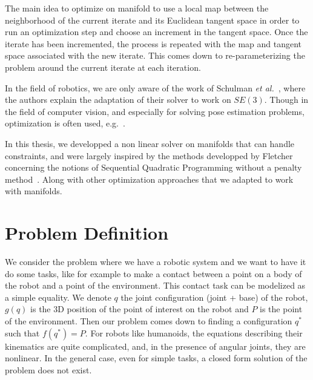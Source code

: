 The main idea to optimize on manifold to use a local map between the neighborhood of the current iterate and its Euclidean tangent space in order to run an optimization step and choose an increment in the tangent space.
Once the iterate has been incremented, the process is repeated with the map and tangent space associated with the new iterate.
This comes down to re-parameterizing the problem around the current iterate at each iteration.

In the field of robotics, we are only aware of the work of Schulman \emph{et al.}~\cite{Schulman2014}, where the authors explain the adaptation of their solver to work on $SE(3)$.
Though in the field of computer vision, and especially for solving pose estimation problems, optimization is often used, e.g.~\cite{hertzberg2011, lu2000fast}.

In this thesis, we developped a non linear solver on manifolds that can handle constraints, and were largely inspired by the methods developped by Fletcher concerning the notions of Sequential Quadratic Programming without a penalty method~\cite{Fletcher:ifip:2006, fletcher2010sequential, fletcher:mathprog:2000}.
Along with other optimization approaches that we adapted to work with manifolds.

\section{Problem Definition}
\label{sec:problem_definition}


We consider the problem where we have a robotic system and we want to have it do some tasks, like for example to make a contact between a point on a body of the robot and a point of the environment.
This contact task can be modelized as a simple equality.
We denote $q$ the joint configuration (joint + base) of the robot, $g(q)$ is the 3D position of the point of interest on the robot and $P$ is the point of the environment.
Then our problem comes down to finding a configuration $q^*$ such that $f(q^*) = P$.
For robots like humanoids, the equations describing their kinematics are quite complicated, and, in the presence of angular joints, they are nonlinear.
In the general case, even for simple tasks, a closed form solution of the problem does not exist.

